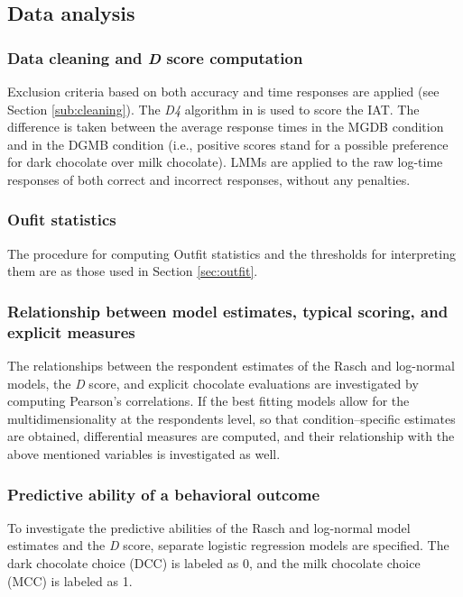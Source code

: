 \documentclass[12pt]{book}
\begin{document}
\subsection{Data analysis}
\subsubsection{Data cleaning and \emph{D} score computation}

Exclusion criteria based on both accuracy \cite{Nosek2002} and time responses \cite{Greenwald2003} are applied (see Section \ref{sub:cleaning}). 
The \emph{D4} algorithm in  is used to score the IAT. 
The difference is taken between the average response times in the MGDB condition and in the DGMB condition (i.e., positive scores stand for a possible preference for dark chocolate over milk chocolate). 
LMMs are applied to the raw log-time responses of both correct and incorrect responses, without any penalties.

\subsubsection{Oufit statistics}

The procedure for computing Outfit statistics and the thresholds for interpreting them are as those used in Section \ref{sec:outfit}. 

\subsubsection{Relationship between model estimates, typical scoring, and explicit measures}

The relationships between the respondent estimates of the Rasch and log-normal models, the \emph{D} score, and explicit chocolate evaluations are investigated by computing Pearson's correlations. 
If the best fitting models allow for the multidimensionality at the respondents level, so that condition--specific estimates are obtained, differential measures are computed, and their relationship with the above mentioned variables is investigated as well.   

\subsubsection{Predictive ability of a behavioral outcome}

To investigate the predictive abilities of the Rasch and log-normal model estimates and the \emph{D} score, separate logistic regression models are specified. 
The dark chocolate choice (DCC) is labeled as 0, and the milk chocolate choice (MCC) is labeled as 1. 
\end{document}
